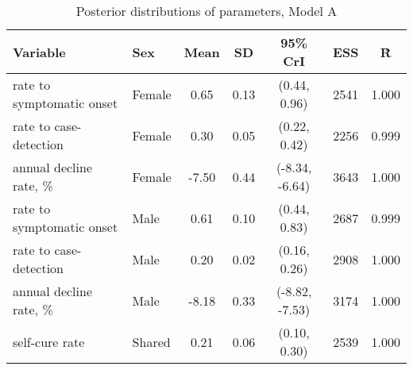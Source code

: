 \begin{table}[h]

\caption{\label{tab:}Posterior distributions of parameters, Model A}
\centering
\begin{tabular}[t]{llccccc}
\toprule
Variable & Sex & Mean & SD & 95\% CrI & ESS & \^{R}\\
\midrule
rate to symptomatic onset & Female & 0.65 & 0.13 & (0.44, 0.96) & 2541 & 1.000\\
rate to case-detection & Female & 0.30 & 0.05 & (0.22, 0.42) & 2256 & 0.999\\
annual decline rate, \% & Female & -7.50 & 0.44 & (-8.34, -6.64) & 3643 & 1.000\\
\addlinespace
rate to symptomatic onset & Male & 0.61 & 0.10 & (0.44, 0.83) & 2687 & 0.999\\
rate to case-detection & Male & 0.20 & 0.02 & (0.16, 0.26) & 2908 & 1.000\\
annual decline rate, \% & Male & -8.18 & 0.33 & (-8.82, -7.53) & 3174 & 1.000\\
\addlinespace
self-cure rate & Shared & 0.21 & 0.06 & (0.10, 0.30) & 2539 & 1.000\\
\bottomrule
\end{tabular}
\end{table}
